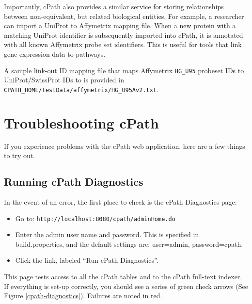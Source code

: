 \documentclass[letterpaper,12pt]{article}
\begin{document}
Importantly, cPath also provides a similar service for storing relationships between non-equivalent, but related biological entities. For example, a researcher can import a
UniProt to Affymetrix mapping file.  When a new protein with a matching UniProt identifier is subsequently imported into cPath, it is annotated with all known Affymetrix probe set identifiers. This is useful for tools that link gene expression data to pathways.

A sample link-out ID mapping file that maps Affymetrix \verb+HG_U95+ probeset IDs to UniProt/SwissProt IDs to is provided in \verb+CPATH_HOME/testData/affymetrix/HG_U95Av2.txt+.  

\section{Troubleshooting cPath}

If you experience problems with the cPath web application, here are a few things to try out.

\subsection{Running cPath Diagnostics}

In the event of an error, the first place to check is the cPath Diagnostics page:

\begin{itemize}

\item Go to:  \verb+http://localhost:8080/cpath/adminHome.do+

\item Enter the admin user name and password.  This is specified in build.properties, and the default settings are:  user=admin, password=cpath.

\item Click the link, labeled ``Run cPath Diagnostics''.

\end{itemize}

This page tests access to all the cPath tables and to the cPath full-text indexer.  If everything is set-up correctly, you should see a series of green check arrows (See Figure \ref{cpath-diagnostics}). Failures are noted in red.  
\end{document}
